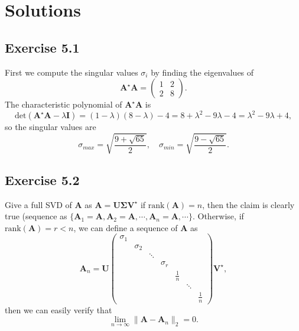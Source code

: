 \documentclass{article}
\begin{document}
\section{Solutions}
\subsection{Exercise 5.1}
First we compute the singular values $\sigma_i$ by finding the eigenvalues of
$$
\bm{A}^{\star} \bm{A} = \begin{pmatrix}
1 & 2 \\
2 & 8
\end{pmatrix}.
$$
The characteristic polynomial of $\bm{A}^\star \bm{A}$ is
$$
\mathrm{det} (\bm{A}^{\star} \bm{A} - \lambda \bm{I}) = (1- \lambda) (8- \lambda) - 4 = 8 + \lambda^2 - 9 \lambda - 4 = \lambda^2 - 9 \lambda + 4,
$$
so the singular values are
$$
\sigma_{max} = \sqrt{\frac{ 9 + \sqrt{65} }{ 2}}, \quad \sigma_{min} = \sqrt{\frac{ 9 - \sqrt{65} }{ 2}}.
$$

\subsection{Exercise 5.2}
Give a full SVD of $\bm{A} $ as $\bm{A} = \bm{U} \bm{\Sigma} \bm{V}^{\star} $ if $\mathrm{rank}(\bm{A}) = n$, then the claim is clearly true (sequence as $\{\bm{A}_1 = \bm{A}, \bm{A}_2 = \bm{A}, \cdots, \bm{A}_n = \bm{A}, \cdots \}$. Otherwise, if $\mathrm{rank}(\bm{A})= r < n$, we can define a sequence of $\bm{A}$ as 
$$
\bm{A}_n = \bm{U} \begin{pmatrix}
    \sigma_1&&&&&& \\
    &\sigma_2&&&&& \\
    &&\ddots&&&& \\
    &&& \sigma_r &&&\\
    &&&&\frac{1}{n}&& \\
    &&&&&\ddots& \\
    &&&&&&\frac{1}{n}
\end{pmatrix} \bm{V}^{\star},
$$
then we can easily verify that 
$$
\lim_{n \to \infty} \| \bm{A} - \bm{A}_n \|_2 = 0.
$$
\end{document}
